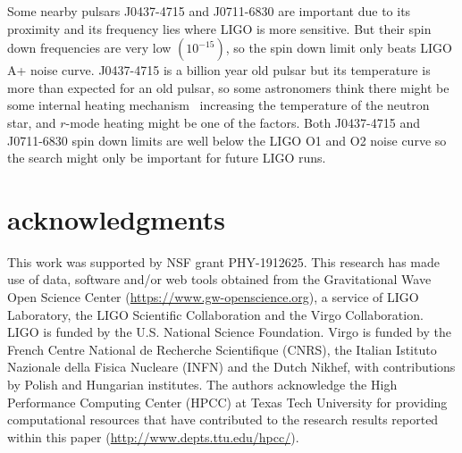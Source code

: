 \documentclass{ttuthes2007}
\begin{document}
Some nearby pulsars J0437-4715 and J0711-6830 are important due to its proximity
and its frequency lies where \ac{LIGO} is more sensitive. But their spin down
frequencies are very low $(10^{-15})$, so the spin down limit only beats LIGO A+
noise curve. J0437-4715 is a billion year old pulsar but its temperature is
more than expected for an old pulsar, so some astronomers think there might be
some internal heating mechanism~\cite{Durant_2012} increasing the temperature of
the neutron star, and $r$-mode heating might be one of the factors. Both
J0437-4715 and J0711-6830 spin down limits are well below the LIGO \ac{O1} and
\ac{O2} noise curve so the search might only be important for future LIGO runs.  

\section*{acknowledgments}
This work was supported by NSF grant PHY-1912625.
This research has made use of data, software and/or web tools obtained from the
Gravitational Wave Open Science Center (\url{https://www.gw-openscience.org}), a
service of LIGO Laboratory, the LIGO Scientific Collaboration and the Virgo
Collaboration. LIGO is funded by the U.S. National Science Foundation. Virgo is
funded by the French Centre National de Recherche Scientifique (CNRS), the
Italian Istituto Nazionale della Fisica Nucleare (INFN) and the Dutch Nikhef,
with contributions by Polish and Hungarian institutes. The authors acknowledge
the High Performance Computing Center (HPCC) at Texas Tech University for
providing computational resources that have contributed to the research results
reported within this paper (\url{http://www.depts.ttu.edu/hpcc/}).


 
\end{document}
